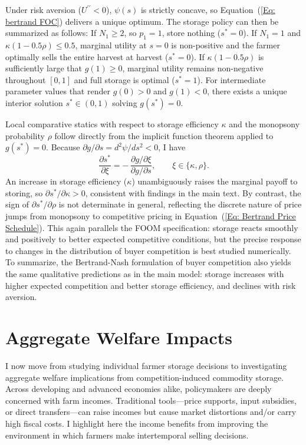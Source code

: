Under risk aversion ($U^{\prime\prime}<0$), $\psi(s)$ is strictly concave, so Equation~(\ref{Eq: bertrand FOC}) delivers a unique optimum. The storage policy can then be summarized as follows: If $N_1 \ge 2$, so $p_1 = 1$, store nothing ($s^*=0$). If $N_1=1$ and $\kappa(1 - 0.5\rho)\leq 0.5$, marginal utility at $s=0$ is non-positive and the farmer optimally sells the entire harvest at harvest ($s^*=0$). If $\kappa(1 - 0.5\rho)$ is sufficiently large that $g(1)\geq 0$, marginal utility remains non-negative throughout $[0,1]$ and full storage is optimal ($s^*=1$). For intermediate parameter values that render $g(0)>0$ and $g(1)<0$, there exists a unique interior solution $s^*\in(0,1)$ solving $g(s^*)=0$.

Local comparative statics with respect to storage efficiency $\kappa$ and the monopsony probability $\rho$ follow directly from the implicit function theorem applied to $g(s^*)=0$. Because $\partial g/\partial s = d^2\psi/ds^2<0$, I have
$$
\frac{\partial s^*}{\partial \xi} = -\,\frac{\partial g / \partial \xi}{\partial g / \partial s},
\qquad
\xi \in \{\kappa,\rho\}.
$$
An increase in storage efficiency ($\kappa$) unambiguously raises the marginal payoff to storing, so $\partial s^*/\partial \kappa>0$, consistent with findings in the main text. By contrast, the sign of $\partial s^*/\partial \rho$ is not determinate in general, reflecting the discrete nature of price jumps from monopsony to competitive pricing in Equation~(\ref{Eq: Bertrand Price Schedule}). This again parallels the FOOM specification: storage reacts smoothly and positively to better expected competitive conditions, but the precise response to changes in the distribution of buyer competition is best studied numerically. To summarize, the Bertrand-Nash formulation of buyer competition also yields the same qualitative predictions as in the main model: storage increases with higher expected competition and better storage efficiency, and declines with risk aversion.



\section{Aggregate Welfare Impacts}\label{subsec:agg_welfare}
\noindent
I now move from studying individual farmer storage decisions to investigating aggregate welfare implications from competition-induced commodity storage. Across developing and advanced economies alike, policymakers are deeply concerned with farm incomes. Traditional tools---price supports, input subsidies, or direct transfers---can raise incomes but cause market distortions and/or carry high fiscal costs. I highlight here the income benefits from improving the environment in which farmers make intertemporal selling decisions.

